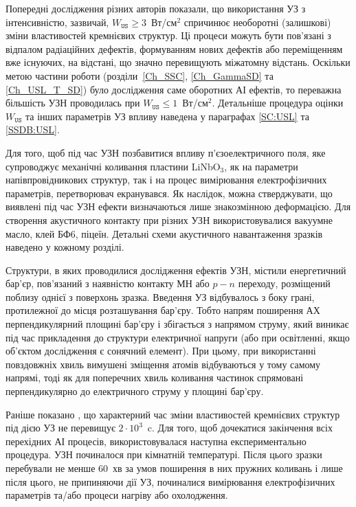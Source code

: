 Попередні дослідження різних авторів \cite{Davletova2008,Davletova2009,Pashaev2014r,Vlasov2009r} показали, що використання УЗ
з інтенсивністю, зазвичай, $W_\mathtt{US}\geq3$~Вт/см$^2$ спричинює необоротні (залишкові) зміни властивостей кремнієвих структур.
Ці процеси можуть бути пов'язані з відпалом радіаційних дефектів, формуванням нових дефектів або переміщенням вже існуючих, на відстані, що значно перевищують міжатомну відстань.
Оскільки метою частини роботи (розділи~\ref{Ch_SSC}, \ref{Ch_GammaSD} та \ref{Ch_USL_T_SD}) було дослідження саме оборотних АІ ефектів,
то переважна більшість УЗН проводилась при $W_\mathtt{US} \leq 1$~Вт/см$^2$.
Детальніше процедура оцінки $W_\mathtt{US}$ та інших параметрів УЗ впливу наведена у параграфах \ref{SC:USL} та \ref{SSDB:USL}.

Для того, щоб під час УЗН позбавитися впливу п'єзоелектричного поля, яке супроводжує механічні коливання пластини LiNbO$_3$,  як на параметри напівпровідникових структур, так і на процес вимірювання електрофізичних параметрів,
перетворювач екранувався.
Як наслідок, можна стверджувати, що виявлені під час УЗН ефекти визначаються лише знакозмінною деформацією.
Для створення акустичного контакту при різних УЗН використовувалися вакуумне масло, клей БФ6, піцеїн.
Детальні схеми акустичного навантаження зразків наведено у кожному розділі.


Структури, в яких проводилися дослідження ефектів УЗН, містили енергетичний бар'єр, пов'язаний з наявністю контакту МН або $p-n$ переходу, розміщений поблизу однієї з поверхонь зразка.
Введення УЗ відбувалось з боку грані, протилежної до місця розташування бар'єру.
Тобто напрям поширення АХ перпендикулярний площині бар'єру і збігається з напрямом струму, який виникає під час прикладення до структури електричної напруги (або при освітленні, якщо об'єктом дослідження є сонячний елемент).
При цьому, при використанні повздовжніх хвиль вимушені зміщення атомів відбуваються у тому самому напрямі, тоді як для поперечних хвиль коливання частинок спрямовані перпендикулярно до електричного струму у площині бар'єру.

Раніше показано \cite{Ostapenko1995,YOlikhTPL2011,Ostrovskii2001}, що характерний час зміни властивостей кремнієвих структур під дією УЗ не перевищує $2\cdot10^3$~c.
Для того, щоб дочекатися закінчення всіх перехідних АІ процесів, використовувалася наступна експериментально процедура.
УЗН починалося при кімнатній температурі.
Після цього зразки перебували не менше 60~хв за умов поширення в них пружних коливань і лише після цього, не припиняючи дії УЗ, починалися вимірювання електрофізичних параметрів та/або процеси нагріву або охолодження.

